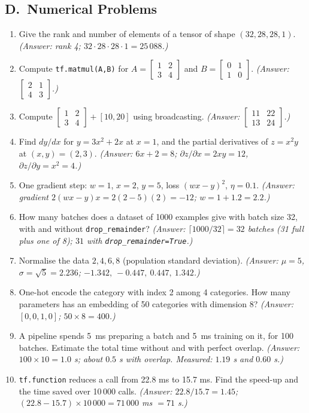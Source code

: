 \subsection*{D.\ Numerical Problems}
\begin{enumerate}
  \item Give the rank and number of elements of a tensor of shape $(32,28,28,1)$. \textit{(Answer: rank 4; $32\cdot28\cdot28\cdot1=25\,088$.)}
  \item Compute \texttt{tf.matmul(A,B)} for $A=\left[\begin{smallmatrix}1&2\\3&4\end{smallmatrix}\right]$ and $B=\left[\begin{smallmatrix}0&1\\1&0\end{smallmatrix}\right]$. \textit{(Answer: $\left[\begin{smallmatrix}2&1\\4&3\end{smallmatrix}\right]$.)}
  \item Compute $\left[\begin{smallmatrix}1&2\\3&4\end{smallmatrix}\right]+[10,20]$ using broadcasting. \textit{(Answer: $\left[\begin{smallmatrix}11&22\\13&24\end{smallmatrix}\right]$.)}
  \item Find $dy/dx$ for $y=3x^2+2x$ at $x=1$, and the partial derivatives of $z=x^2y$ at $(x,y)=(2,3)$. \textit{(Answer: $6x+2=8$; $\partial z/\partial x=2xy=12$, $\partial z/\partial y=x^2=4$.)}
  \item One gradient step: $w=1$, $x=2$, $y=5$, loss $(wx-y)^2$, $\eta=0.1$. \textit{(Answer: gradient $2(wx-y)x=2(2-5)(2)=-12$; $w=1+1.2=2.2$.)}
  \item How many batches does a dataset of 1000 examples give with batch size 32, with and without \texttt{drop\_remainder}? \textit{(Answer: $\lceil1000/32\rceil=32$ batches (31 full plus one of 8); $31$ with \texttt{drop\_remainder=True}.)}
  \item Normalise the data $2,4,6,8$ (population standard deviation). \textit{(Answer: $\mu=5$, $\sigma=\sqrt5=2.236$; $-1.342,\ -0.447,\ 0.447,\ 1.342$.)}
  \item One-hot encode the category with index 2 among 4 categories. How many parameters has an embedding of 50 categories with dimension 8? \textit{(Answer: $[0,0,1,0]$; $50\times8=400$.)}
  \item A pipeline spends 5~ms preparing a batch and 5~ms training on it, for 100 batches. Estimate the total time without and with perfect overlap. \textit{(Answer: $100\times10=1.0$ s; about $0.5$ s with overlap. Measured: $1.19$ s and $0.60$ s.)}
  \item \texttt{tf.function} reduces a call from 22.8 ms to 15.7 ms. Find the speed-up and the time saved over 10\,000 calls. \textit{(Answer: $22.8/15.7=1.45$; $(22.8-15.7)\times10\,000=71\,000$ ms $=71$ s.)}
\end{enumerate}

